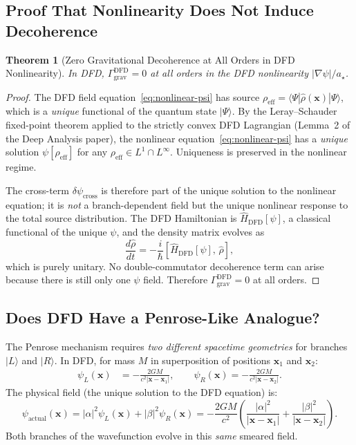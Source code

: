 \documentclass[11pt]{article}
\newtheorem{theorem}{Theorem}[section]
\theoremstyle{definition}
\theoremstyle{remark}
\begin{document}
\subsection{Proof That Nonlinearity Does Not Induce Decoherence}

\begin{theorem}[Zero Gravitational Decoherence at All Orders in DFD Nonlinearity]
\label{thm:nonlinear-zero}
In DFD, $\Gamma_{\mathrm{grav}}^{\mathrm{DFD}} = 0$ at all orders in the DFD
nonlinearity $|\nabla\psi|/a_\star$.
\end{theorem}

\begin{proof}
The DFD field equation~\eqref{eq:nonlinear-psi} has source
$\rho_{\mathrm{eff}} = \langle\Psi|\hat{\rho}(\mathbf{x})|\Psi\rangle$, which is
a \emph{unique} functional of the quantum state $|\Psi\rangle$.  By the
Leray--Schauder fixed-point theorem applied to the strictly convex DFD Lagrangian
(Lemma~2 of the Deep Analysis paper), the nonlinear equation~\eqref{eq:nonlinear-psi}
has a \emph{unique} solution $\psi[\rho_{\mathrm{eff}}]$ for any
$\rho_{\mathrm{eff}} \in L^1 \cap L^\infty$.  Uniqueness is preserved in the nonlinear
regime.

The cross-term $\delta\psi_{\mathrm{cross}}$ is therefore part of the unique
solution to the nonlinear equation; it is \emph{not} a branch-dependent field
but the unique nonlinear response to the total source distribution.  The DFD
Hamiltonian is $\hat{H}_{\mathrm{DFD}}[\psi]$, a classical functional of the unique
$\psi$, and the density matrix evolves as
\begin{equation}
  \frac{d\hat{\rho}}{dt} = -\frac{i}{\hbar}[\hat{H}_{\mathrm{DFD}}[\psi],\,\hat{\rho}],
\end{equation}
which is purely unitary.  No double-commutator decoherence term can arise
because there is still only one $\psi$ field.  Therefore
$\Gamma_{\mathrm{grav}}^{\mathrm{DFD}} = 0$ at all orders.
\end{proof}

\subsection{Does DFD Have a Penrose-Like Analogue?}

The Penrose mechanism requires \emph{two different spacetime geometries} for
branches $|L\rangle$ and $|R\rangle$.  In DFD, for mass $M$ in superposition
of positions $\mathbf{x}_1$ and $\mathbf{x}_2$:
\begin{align}
  \psi_L(\mathbf{x}) &= -\frac{2GM}{c^2|\mathbf{x}-\mathbf{x}_1|}, \qquad
  \psi_R(\mathbf{x}) = -\frac{2GM}{c^2|\mathbf{x}-\mathbf{x}_2|}.
\end{align}
The physical field (the unique solution to the DFD equation) is:
\begin{equation}
  \psi_{\mathrm{actual}}(\mathbf{x}) = |\alpha|^2\psi_L(\mathbf{x})
  + |\beta|^2\psi_R(\mathbf{x})
  = -\frac{2GM}{c^2}\!\left(\frac{|\alpha|^2}{|\mathbf{x}-\mathbf{x}_1|}
  + \frac{|\beta|^2}{|\mathbf{x}-\mathbf{x}_2|}\right). \label{eq:actual-psi}
\end{equation}
Both branches of the wavefunction evolve in this \emph{same} smeared field.
\end{document}
